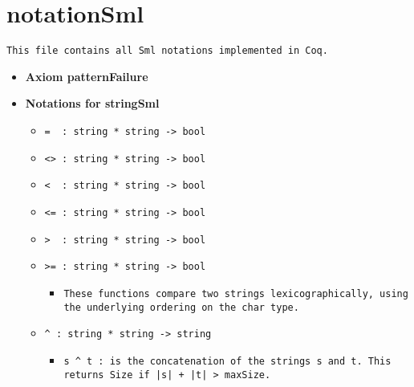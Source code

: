 \documentclass[11pt]{report}
\begin{document}

\section*{notationSml}

\texttt{This file contains all Sml notations implemented in Coq.}



\begin{itemize}
\item  \textbf{ Axiom patternFailure }


\item  \textbf{ Notations for stringSml }

\begin{itemize}
\item  \texttt{= \ : string * string -> bool}

\item  \texttt{<> : string * string -> bool}

\item  \texttt{< \ : string * string -> bool}

\item  \texttt{<= : string * string -> bool}

\item  \texttt{> \ : string * string -> bool}

\item  \texttt{>= : string * string -> bool}

\begin{itemize}
\item \begin{flushleft} \texttt{These functions compare two strings lexicographically, using the underlying ordering on the char type.} \end{flushleft}
\end{itemize}
\coqdocemptyline

\item  \texttt{\^{}  : string * string -> string}

\begin{itemize}
\item  \begin{flushleft} \texttt{s \^{} t : is the concatenation of the strings s and t. This returns Size if |s| + |t| > maxSize.} \end{flushleft}
\end{itemize}


\end{itemize}
\end{itemize}
\end{document}

